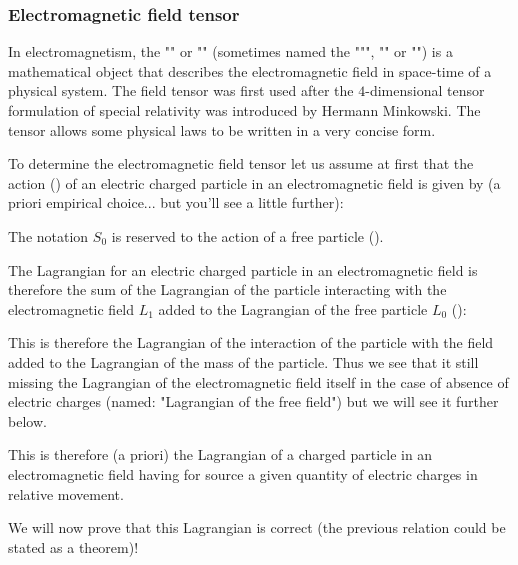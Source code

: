 	\subsubsection{Electromagnetic field tensor}
	In electromagnetism, the "" or "" (sometimes named the """, "" or "") is a mathematical object that describes the electromagnetic field in space-time of a physical system. The field tensor was first used after the $4$-dimensional tensor formulation of special relativity was introduced by Hermann Minkowski. The tensor allows some physical laws to be written in a very concise form.
	
	To determine the electromagnetic field tensor let us assume at first that the action () of an electric charged particle in an electromagnetic field is given by (a priori empirical choice... but you'll see a little further):
	
	\begin{tcolorbox}[title=Remark,colframe=black,arc=10pt]
	The notation $S_0$ is reserved to the action of a free particle ().
	\end{tcolorbox}
	The Lagrangian for an electric charged particle in an electromagnetic field is therefore the sum of the Lagrangian of the particle interacting with the electromagnetic field $L_1$ added to the Lagrangian of the free particle $L_0$ ():
	
	\begin{tcolorbox}[title=Remark,colframe=black,arc=10pt]
	This is therefore the Lagrangian of the interaction of the particle with the field added to the Lagrangian of the mass of the particle. Thus we see that it still missing the Lagrangian of the electromagnetic field itself in the case of absence of electric charges (named: "Lagrangian of the free field") but we will see it further below.
	\end{tcolorbox}
	This is therefore (a priori) the Lagrangian of a charged particle in an electromagnetic field having for source a given quantity of electric charges in relative movement.
	
	We will now prove that this Lagrangian is correct (the previous relation could be stated as a theorem)!
	
